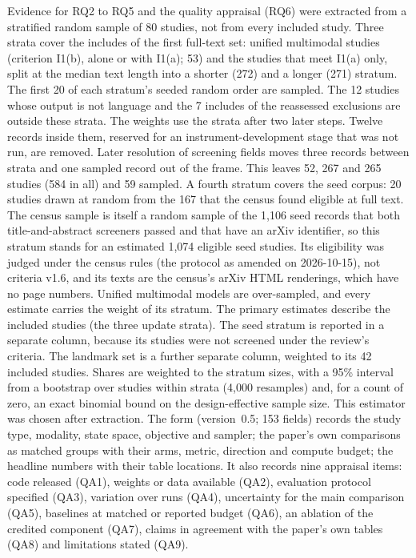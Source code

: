 \documentclass[acmsmall,screen]{acmart}
\begin{document}
Evidence for RQ2 to RQ5 and the quality appraisal (RQ6) were extracted from a stratified random sample of 80 studies, not from every included study. Three strata cover the includes of the first full-text set: unified multimodal studies (criterion I1(b), alone or with I1(a); 53) and the studies that meet I1(a) only, split at the median text length into a shorter (272) and a longer (271) stratum. The first 20 of each stratum's seeded random order are sampled. The 12 studies whose output is not language and the 7 includes of the reassessed exclusions are outside these strata. The weights use the strata after two later steps. Twelve records inside them, reserved for an instrument-development stage that was not run, are removed. Later resolution of screening fields moves three records between strata and one sampled record out of the frame. This leaves 52, 267 and 265 studies (584 in all) and 59 sampled. A fourth stratum covers the seed corpus: 20 studies drawn at random from the 167 that the census found eligible at full text. The census sample is itself a random sample of the 1,106 seed records that both title-and-abstract screeners passed and that have an arXiv identifier, so this stratum stands for an estimated 1,074 eligible seed studies. Its eligibility was judged under the census rules (the protocol as amended on 2026-10-15), not criteria v1.6, and its texts are the census's arXiv HTML renderings, which have no page numbers. Unified multimodal models are over-sampled, and every estimate carries the weight of its stratum. The primary estimates describe the included studies (the three update strata). The seed stratum is reported in a separate column, because its studies were not screened under the review's criteria. The landmark set is a further separate column, weighted to its 42 included studies. Shares are weighted to the stratum sizes, with a 95\% interval from a bootstrap over studies within strata (4,000 resamples) and, for a count of zero, an exact binomial bound on the design-effective sample size. This estimator was chosen after extraction. %
The form (version~0.5; 153 fields) records the study type, modality, state space, objective and sampler; the paper's own comparisons as matched groups with their arms, metric, direction and compute budget; the headline numbers with their table locations. It also records nine appraisal items: code released (QA1), weights or data available (QA2), evaluation protocol specified (QA3), variation over runs (QA4), uncertainty for the main comparison (QA5), baselines at matched or reported budget (QA6), an ablation of the credited component (QA7), claims in agreement with the paper's own tables (QA8) and limitations stated (QA9). %
\end{document}
